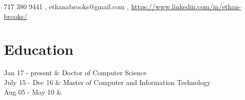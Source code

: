 \documentclass[]{resume}
\begin{document}
\pagestyle{empty} %

{\faMobile \hspace{\FAspace} 717 380 9441
	\sep
	\faEnvelope
	\hspace{\FAspace}
	ethanabrooks@gmail.com
	\sep
	\faLinkedinSquare
	\hspace{\FAspace}
	\url{https://www.linkedin.com/in/ethan-brooks/}
}

\section*{Education}
\begin{tabularcv}
	Jan 17 - present & 
	{Doctor of Computer Science}
	\\[\vspacepar] %
	July 15 - Dec 16 & 
	{Master of Computer and Information Technology}
	\\[\vspacepar] %
	Aug 05 - May 10 & 
\end{tabularcv}
\end{document}
